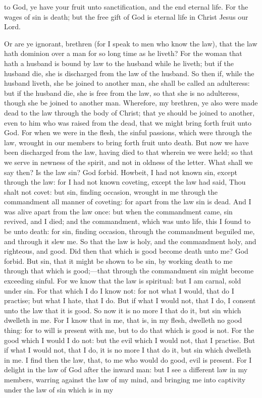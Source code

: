 to God, ye have your fruit unto sanctification, and the end eternal life. For the wages of sin is death; but the free gift of God is eternal life in Christ Jesus our Lord. 

Or are ye ignorant, brethren (for I speak to men who know the law), that the law hath dominion over a man for so long time as he liveth? For the woman that hath a husband is bound by law to the husband while he liveth; but if the husband die, she is discharged from the law of the husband. So then if, while the husband liveth, she be joined to another man, she shall be called an adulteress: but if the husband die, she is free from the law, so that she is no adulteress, though she be joined to another man. Wherefore, my brethren, ye also were made dead to the law through the body of Christ; that ye should be joined to another, even to him who was raised from the dead, that we might bring forth fruit unto God. For when we were in the flesh, the sinful passions, which were through the law, wrought in our members to bring forth fruit unto death. But now we have been discharged from the law, having died to that wherein we were held; so that we serve in newness of the spirit, and not in oldness of the letter.  What shall we say then? Is the law sin? God forbid. Howbeit, I had not known sin, except through the law: for I had not known coveting, except the law had said, Thou shalt not covet: but sin, finding occasion, wrought in me through the commandment all manner of coveting: for apart from the law sin is dead. And I was alive apart from the law once: but when the commandment came, sin revived, and I died; and the commandment, which was unto life, this I found to be unto death: for sin, finding occasion, through the commandment beguiled me, and through it slew me. So that the law is holy, and the commandment holy, and righteous, and good. Did then that which is good become death unto me? God forbid. But sin, that it might be shown to be sin, by working death to me through that which is good;—that through the commandment sin might become exceeding sinful. For we know that the law is spiritual: but I am carnal, sold under sin. For that which I do I know not: for not what I would, that do I practise; but what I hate, that I do. But if what I would not, that I do, I consent unto the law that it is good. So now it is no more I that do it, but sin which dwelleth in me. For I know that in me, that is, in my flesh, dwelleth no good thing: for to will is present with me, but to do that which is good is not. For the good which I would I do not: but the evil which I would not, that I practise. But if what I would not, that I do, it is no more I that do it, but sin which dwelleth in me. I find then the law, that, to me who would do good, evil is present. For I delight in the law of God after the inward man: but I see a different law in my members, warring against the law of my mind, and bringing me into captivity under the law of sin which is in my 